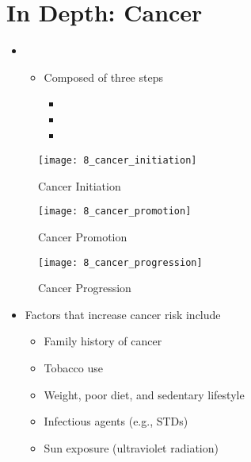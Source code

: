 \documentclass[title={Chapter 8}]{fdsn201notes}
\begin{document}
\section{In Depth: Cancer}\label{sec:in-depth:-cancer}
\begin{itemize}
	\item {}
	\begin{itemize}
		\item Composed of three steps
		\begin{itemize}
			\item {}
			\item {}
			\item {}
		\end{itemize}
	\end{itemize}
\end{itemize}

\begin{figure}[H]
	\centering
	\texttt{[image: 8\_cancer\_initiation]}
	\caption{Cancer Initiation}
	\label{fig:cancer-initiation}
\end{figure}


\begin{figure}[H]
	\centering
	\texttt{[image: 8\_cancer\_promotion]}
	\caption{Cancer Promotion}
	\label{fig:cancer-promotion}
\end{figure}


\begin{figure}[H]
	\centering
	\texttt{[image: 8\_cancer\_progression]}
	\caption{Cancer Progression}
	\label{fig:cancer-progression}
\end{figure}

\begin{itemize}
	\item Factors that increase cancer risk include
	\begin{itemize}
		\item Family history of cancer
		\item Tobacco use
		\item Weight, poor diet, and sedentary lifestyle
		\item Infectious agents (e.g., STDs)
		\item Sun exposure (ultraviolet radiation)
	\end{itemize}
\end{itemize}
\end{document}

